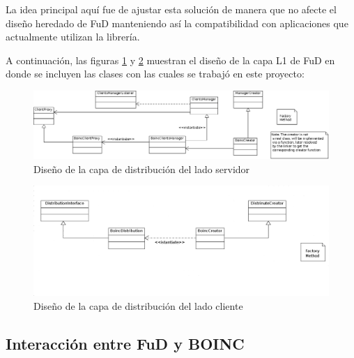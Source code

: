 La idea principal aquí fue de ajustar esta solución de manera que no afecte el diseño heredado de FuD manteniendo así la compatibilidad con aplicaciones que actualmente utilizan la librería. 

A continuación, las figuras \ref{fig:server-L1} y \ref{fig:cliente-L1} muestran el diseño de la capa L1 de FuD en donde se incluyen las clases con las cuales se trabajó en este proyecto:

\begin{landscape}
	\begin{figure}[H]
		\begin{center}
  			\vspace{100pt}
  			\includegraphics[scale=0.45]{images/Server_FuD-BOINC.png}
			\caption{Diseño de la capa de distribución del lado servidor}
			\label{fig:server-L1}
			\end{center}
	\end{figure} 

	\begin{figure}[H]
		\begin{center}
  			\vspace{100pt}
  			\includegraphics[scale=0.45]{images/Client_FuD-BOINC.png}
			\caption{Diseño de la capa de distribución del lado cliente}
			\label{fig:cliente-L1}
			\end{center}
	\end{figure} 
\end{landscape}

\subsection{Interacción entre FuD y BOINC}

